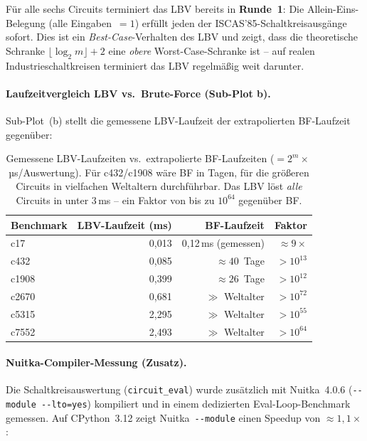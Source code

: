 ﻿\documentclass[a4paper,12pt]{article}
\theoremstyle{definition}
\begin{document}
Für alle sechs Circuits terminiert das LBV bereits in \textbf{Runde~1}:
Die Allein-Eins-Belegung (alle Eingaben~$= 1$) erfüllt jeden der
ISCAS'85-Schaltkreisausgänge sofort.  Dies ist ein \emph{Best-Case}-Verhalten
des LBV und zeigt, dass die theoretische Schranke
$\lfloor\log_2 m\rfloor + 2$ eine \emph{obere} Worst-Case-Schranke ist --
auf realen Industrieschaltkreisen terminiert das LBV regelmäßig weit darunter.

\paragraph{Laufzeitvergleich LBV vs.\ Brute-Force (Sub-Plot b).}
Sub-Plot~(b) stellt die gemessene LBV-Laufzeit der extrapolierten
BF-Laufzeit gegenüber:

\begin{table}[h]
  \centering
  \begin{tabular}{lrrr}
    \toprule
    \textbf{Benchmark} & \textbf{LBV-Laufzeit (ms)} & \textbf{BF-Laufzeit}
      & \textbf{Faktor} \\
    \midrule
    c17   &              0{,}013 &        0{,}12\,ms (gemessen) & ${\approx}9\times$ \\
    c432  &              0{,}085 &        ${\approx}40$~Tage    & $>10^{13}$ \\
    c1908 &              0{,}399 &        ${\approx}26$~Tage    & $>10^{12}$ \\
    c2670 &              0{,}681 & $\gg$ Weltalter              & $>10^{72}$ \\
    c5315 &              2{,}295 & $\gg$ Weltalter              & $>10^{55}$ \\
    c7552 &              2{,}493 & $\gg$ Weltalter              & $>10^{64}$ \\
    \bottomrule
  \end{tabular}
  \caption{Gemessene LBV-Laufzeiten vs.\ extrapolierte BF-Laufzeiten
           ($= 2^m \times$\, µs/Auswertung).  Für c432/c1908 wäre BF in
           Tagen, für die größeren Circuits in vielfachen Weltaltern
           durchführbar.  Das LBV löst \emph{alle} Circuits in unter
           $3$\,ms -- ein Faktor von bis zu $10^{64}$ gegenüber BF.}
  \label{tab:lbv-bf-zeiten}
\end{table}

\paragraph{Nuitka-Compiler-Messung (Zusatz).}
Die Schaltkreisauswertung (\texttt{circuit\_eval}) wurde zusätzlich mit
Nuitka~4.0.6 (\texttt{-{}-module -{}-lto=yes}) kompiliert und in einem
dedizierten Eval-Loop-Benchmark gemessen.  Auf CPython~3.12 zeigt
Nuitka~\texttt{-{}-module} einen Speedup von ${\approx}1{,}1\times$:
\end{document}
